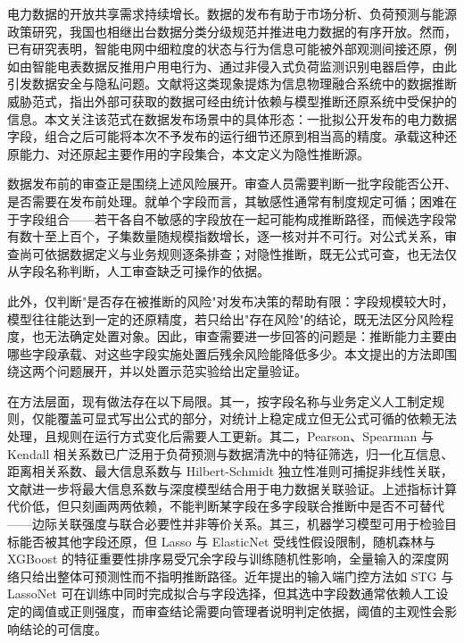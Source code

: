 \documentclass[UTF8,zihao=5,twoside,fontset=none]{ctexart}
\begin{document}
电力数据的开放共享需求持续增长。数据的发布有助于市场分析、负荷预测与能源政策研究\cite{ref-zhu-sharing}，我国也相继出台数据分类分级规范并推进电力数据的有序开放\cite{ref-gbt-classify}。然而，已有研究表明，智能电网中细粒度的状态与行为信息可能被外部观测间接还原，例如由智能电表数据反推用户用电行为\cite{ref-sankar,ref-giaconi}、通过非侵入式负荷监测识别电器启停\cite{ref-chen-privacy,ref-wang-meter}，由此引发数据安全与隐私问题\cite{ref-adewole,ref-zhang-sgcc}。文献\cite{ref-liu-data-inference}将这类现象提炼为信息物理融合系统中的数据推断威胁范式，指出外部可获取的数据可经由统计依赖与模型推断还原系统中受保护的信息。本文关注该范式在数据发布场景中的具体形态：一批拟公开发布的电力数据字段，组合之后可能将本次不予发布的运行细节还原到相当高的精度。承载这种还原能力、对还原起主要作用的字段集合，本文定义为隐性推断源。

数据发布前的审查正是围绕上述风险展开。审查人员需要判断一批字段能否公开、是否需要在发布前处理。就单个字段而言，其敏感性通常有制度规定可循；困难在于字段组合——若干各自不敏感的字段放在一起可能构成推断路径，而候选字段常有数十至上百个，子集数量随规模指数增长，逐一核对并不可行。对公式关系，审查尚可依据数据定义与业务规则逐条排查；对隐性推断，既无公式可查，也无法仅从字段名称判断，人工审查缺乏可操作的依据。

此外，仅判断"是否存在被推断的风险"对发布决策的帮助有限：字段规模较大时，模型往往能达到一定的还原精度，若只给出"存在风险"的结论，既无法区分风险程度，也无法确定处置对象。因此，审查需要进一步回答的问题是：推断能力主要由哪些字段承载、对这些字段实施处置后残余风险能降低多少。本文提出的方法即围绕这两个问题展开，并以处置示范实验给出定量验证。

在方法层面，现有做法存在以下局限。其一，按字段名称与业务定义人工制定规则，仅能覆盖可显式写出公式的部分，对统计上稳定成立但无公式可循的依赖无法处理，且规则在运行方式变化后需要人工更新。其二，Pearson、Spearman 与 Kendall 相关系数\cite{ref-pearson,ref-spearman,ref-kendall}已广泛用于负荷预测与数据清洗中的特征筛选\cite{ref-lan-load,ref-jiao-pv,ref-deng-load}，归一化互信息\cite{ref-cover-info}、距离相关系数\cite{ref-szekely-dcorr}、最大信息系数\cite{ref-reshef-mic}与 Hilbert-Schmidt 独立性准则\cite{ref-gretton-hsic}可捕捉非线性关联，文献\cite{ref-xing-micdnn}进一步将最大信息系数与深度模型结合用于电力数据关联验证。上述指标计算代价低，但只刻画两两依赖，不能判断某字段在多字段联合推断中是否不可替代——边际关联强度与联合必要性并非等价关系。其三，机器学习模型可用于检验目标能否被其他字段还原\cite{ref-tibshirani-lasso,ref-zou-enet,ref-breiman-rf,ref-chen-xgboost,ref-lecun-deep}，但 Lasso 与 ElasticNet 受线性假设限制，随机森林与 XGBoost 的特征重要性排序易受冗余字段与训练随机性影响，全量输入的深度网络只给出整体可预测性而不指明推断路径。近年提出的输入端门控方法如 STG\cite{ref-stg} 与 LassoNet\cite{ref-lassonet} 可在训练中同时完成拟合与字段选择，但其选中字段数通常依赖人工设定的阈值或正则强度，而审查结论需要向管理者说明判定依据，阈值的主观性会影响结论的可信度。
\end{document}
